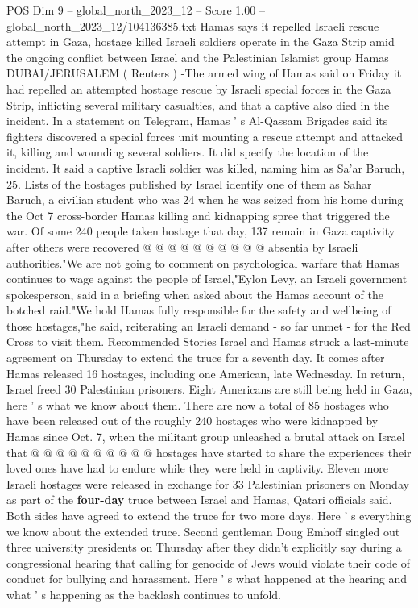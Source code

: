 \begin{textsample}{POS Dim 9 – global\_north\_2023\_12 – Score 1.00 – global\_north\_2023\_12/104136385.txt}  \label{ex:f9_pos_169}
Hamas says it repelled Israeli rescue attempt in Gaza, hostage killed Israeli soldiers operate in the Gaza Strip amid the ongoing conflict between Israel and the Palestinian Islamist group Hamas DUBAI/JERUSALEM ( Reuters ) -The armed wing of Hamas said on Friday it had repelled an attempted hostage rescue by Israeli special forces in the Gaza Strip, inflicting several military casualties, and that a captive also died in the incident.
In a statement on Telegram, Hamas ' s Al-Qassam Brigades said its fighters discovered a special forces unit mounting a rescue attempt and attacked it, killing and wounding several soldiers.
It did specify the location of the incident.
It said a captive Israeli soldier was killed, naming him as Sa'ar Baruch, 25.
Lists of the hostages published by Israel identify one of them as Sahar Baruch, a civilian student who was 24 when he was seized from his home during the Oct 7 cross-border Hamas killing and kidnapping spree that triggered the war.
Of some 240 people taken hostage that day, 137 remain in Gaza captivity after others were recovered @ @ @ @ @ @ @ @ @ @ absentia by Israeli authorities."We are not going to comment on psychological warfare that Hamas continues to wage against the people of Israel,"Eylon Levy, an Israeli government spokesperson, said in a briefing when asked about the Hamas account of the botched raid."We hold Hamas fully responsible for the safety and wellbeing of those hostages,"he said, reiterating an Israeli demand - so far unmet - for the Red Cross to visit them.
Recommended Stories Israel and Hamas struck a last-minute agreement on Thursday to extend the truce for a seventh day.
It comes after Hamas released 16 hostages, including one American, late Wednesday.
In return, Israel freed 30 Palestinian prisoners.
Eight Americans are still being held in Gaza, here ' s what we know about them.
There are now a total of 85 hostages who have been released out of the roughly 240 hostages who were kidnapped by Hamas since Oct. 7, when the militant group unleashed a brutal attack on Israel that @ @ @ @ @ @ @ @ @ @ hostages have started to share the experiences their loved ones have had to endure while they were held in captivity.
Eleven more Israeli hostages were released in exchange for 33 Palestinian prisoners on Monday as part of the \textbf{four-day} truce between Israel and Hamas, Qatari officials said.
Both sides have agreed to extend the truce for two more days.
Here ' s everything we know about the extended truce.
Second gentleman Doug Emhoff singled out three university presidents on Thursday after they didn't explicitly say during a congressional hearing that calling for genocide of Jews would violate their code of conduct for bullying and harassment.
Here ' s what happened at the hearing and what ' s happening as the backlash continues to unfold.

\end{textsample}
